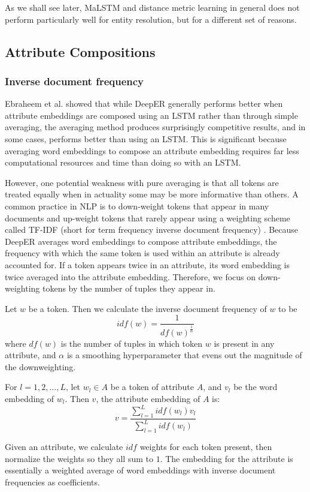 \documentclass{proc}
\begin{document}
As we shall see later, MaLSTM and distance metric learning in general does not perform particularly well for entity resolution, but for a different set of reasons.

\subsection{Attribute Compositions}

\subsubsection{Inverse document frequency}

Ebraheem et al. \cite{ebraheem-deep-er} showed that while DeepER generally performs better when attribute embeddings are composed using an LSTM rather than through simple averaging, the averaging method produces surprisingly competitive results, and in some cases, performs better than using an LSTM. This is significant because averaging word embeddings to compose an attribute embedding requires far less computational resources and time than doing so with an LSTM.

However, one potential weakness with pure averaging is that all tokens are treated equally when in actuality some may be more informative than others. A common practice in NLP is to down-weight tokens that appear in many documents and up-weight tokens that rarely appear using a weighting scheme called TF-IDF (short for term frequency inverse document frequency) \cite{ramos-using}. Because DeepER averages word embeddings to compose attribute embeddings, the frequency with which the same token is used within an attribute is already accounted for. If a token appears twice in an attribute, its word embedding is twice averaged into the attribute embedding. Therefore, we focus on down-weighting tokens by the number of tuples they appear in.

Let $w$ be a token. Then we calculate the inverse document frequency of $w$ to be $$idf(w) = \frac{1}{df(w)^{\frac{1}{\alpha}}}$$ where $df(w)$ is the number of tuples in which token $w$ is present in any attribute, and $\alpha$ is a smoothing hyperparameter that evens out the magnitude of the downweighting.

For $l = 1, 2, ..., L$, let $w_l \in A$ be a token of attribute $A$, and $v_l$ be the word embedding of $w_l$. Then $v$, the attribute embedding of $A$ is: $$v = \frac{\sum_{l=1}^L idf(w_l)v_l}{\sum_{l=1}^L idf(w_l)}$$

Given an attribute, we calculate $idf$ weights for each token present, then normalize the weights so they all sum to $1$. The embedding for the attribute is essentially a weighted average of word embeddings with inverse document frequencies as coefficients.
\end{document}
